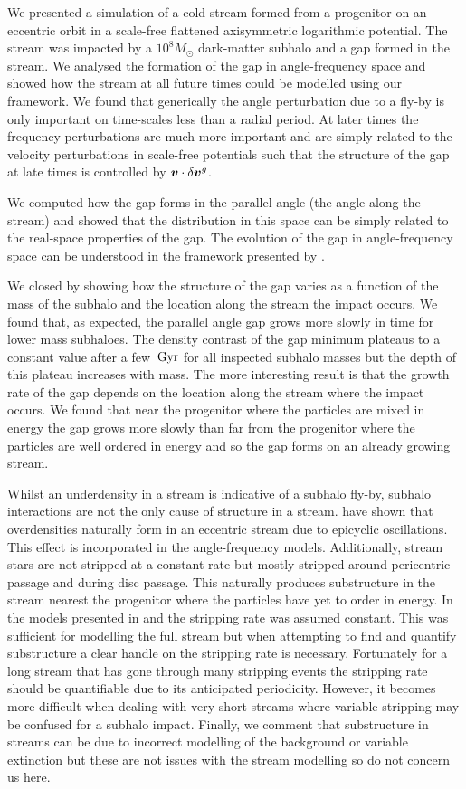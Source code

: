 \documentclass[useAMS,usenatbib,fleqn,a4paper]{mn2e}
\def\Gyr{\,{\rm Gyr}}
\newcommand{\bs}[1]{\bmath{#1}}
\begin{document}
We presented a simulation of a cold stream formed from a progenitor on an eccentric orbit in a scale-free flattened axisymmetric logarithmic potential. The stream was impacted by a $10^8M_\odot$ dark-matter subhalo and a gap formed in the stream. We analysed the formation of the gap in angle-frequency space and showed how the stream at all future times could be modelled using our framework. We found that generically the angle perturbation due to a fly-by is only important on time-scales less than a radial period. At later times the frequency perturbations are much more important and are simply related to the velocity perturbations in scale-free potentials such that the structure of the gap at late times is controlled by $\bs{v}\cdot\delta\bs{v}^g$.

We computed how the gap forms in the parallel angle (the angle along the stream) and showed that the distribution in this space can be simply related to the real-space properties of the gap. The evolution of the gap in angle-frequency space can be understood in the framework presented by \cite{ErkalBelokurov2015}.

We closed by showing how the structure of the gap varies as a function of the mass of the subhalo and the location along the stream the impact occurs. We found that, as expected, the parallel angle gap grows more slowly in time for lower mass subhaloes. The density contrast of the gap minimum plateaus to a constant value after a few $\Gyr$ for all inspected subhalo masses but the depth of this plateau increases with mass. The more interesting result is that the growth rate of the gap depends on the location along the stream where the impact occurs. We found that near the progenitor where the particles are mixed in energy the gap grows more slowly than far from the progenitor where the particles are well ordered in energy and so the gap forms on an already growing stream.

Whilst an underdensity in a stream is indicative of a subhalo fly-by, subhalo interactions are not the only cause of structure in a stream. \cite{Kupper2010} have shown that overdensities naturally form in an eccentric stream due to epicyclic oscillations. This effect is incorporated in the angle-frequency models. Additionally, stream stars are not stripped at a constant rate but mostly stripped around pericentric passage and during disc passage. This naturally produces substructure in the stream nearest the progenitor where the particles have yet to order in energy. In the models presented in \cite{Bovy2014} and \cite{Sanders2014} the stripping rate was assumed constant. This was sufficient for modelling the full stream but when attempting to find and quantify substructure a clear handle on the stripping rate is necessary. Fortunately for a long stream that has gone through many stripping events the stripping rate should be quantifiable due to its anticipated periodicity. However, it becomes more difficult when dealing with very short streams where variable stripping may be confused for a subhalo impact. Finally, we comment that substructure in streams can be due to incorrect modelling of the background or variable extinction but these are not issues with the stream modelling so do not concern us here.
\end{document}
